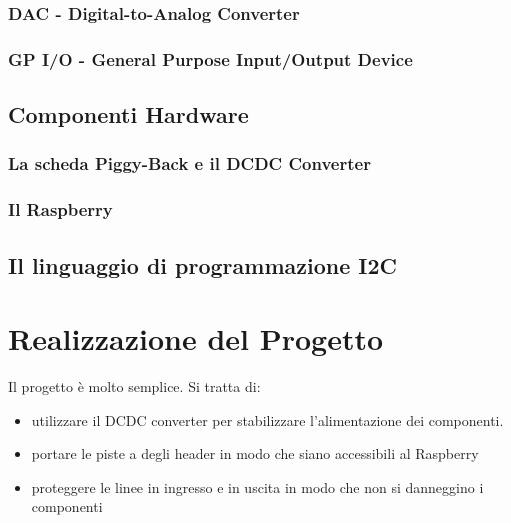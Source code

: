 \documentclass[10pt]{article}
\begin{document}
		\subsubsection{DAC - Digital-to-Analog Converter}\label{sec:dac}

		\subsubsection{GP I/O - General Purpose Input/Output Device}\label{sec:gpio}

	\subsection{Componenti Hardware}
		\subsubsection{La scheda Piggy-Back e il DCDC Converter}\label{sec:piggy}

		\subsubsection{Il Raspberry}\label{sec:rasp}

	\subsection{Il linguaggio di programmazione I2C}\label{sec:i2c}

\section{Realizzazione del Progetto}
		Il progetto è molto semplice. Si tratta di:
		\begin{itemize}
		        \item utilizzare il DCDC converter per stabilizzare l'alimentazione dei componenti.
		        \item portare le piste a degli header in modo che siano accessibili al Raspberry
		        \item proteggere le linee in ingresso e in uscita in modo che non si danneggino i componenti
		\end{itemize}
\end{document}
